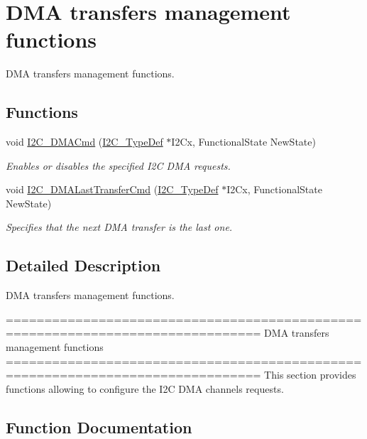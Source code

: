 \hypertarget{group___i2_c___group4}{}\section{D\+M\+A transfers management functions}
\label{group___i2_c___group4}


D\+M\+A transfers management functions.  


\subsection*{Functions}
\begin{DoxyCompactItemize}
\item 
void \hyperlink{group___i2_c___group4_ga38502ce11e5ec923e0f6476aaa35b45c}{I2\+C\+\_\+\+D\+M\+A\+Cmd} (\hyperlink{struct_i2_c___type_def}{I2\+C\+\_\+\+Type\+Def} $\ast$I2\+Cx, Functional\+State New\+State)
\begin{DoxyCompactList}\small\item\em Enables or disables the specified I2\+C D\+M\+A requests. \end{DoxyCompactList}\item 
void \hyperlink{group___i2_c___group4_gab2e994c5681eb6ec7c26a03ffe1de060}{I2\+C\+\_\+\+D\+M\+A\+Last\+Transfer\+Cmd} (\hyperlink{struct_i2_c___type_def}{I2\+C\+\_\+\+Type\+Def} $\ast$I2\+Cx, Functional\+State New\+State)
\begin{DoxyCompactList}\small\item\em Specifies that the next D\+M\+A transfer is the last one. \end{DoxyCompactList}\end{DoxyCompactItemize}


\subsection{Detailed Description}
D\+M\+A transfers management functions. 

\begin{DoxyVerb} ===============================================================================
                         DMA transfers management functions
 ===============================================================================  
  This section provides functions allowing to configure the I2C DMA channels 
  requests.\end{DoxyVerb}
 

\subsection{Function Documentation}
\hypertarget{group___i2_c___group4_ga38502ce11e5ec923e0f6476aaa35b45c}{}
